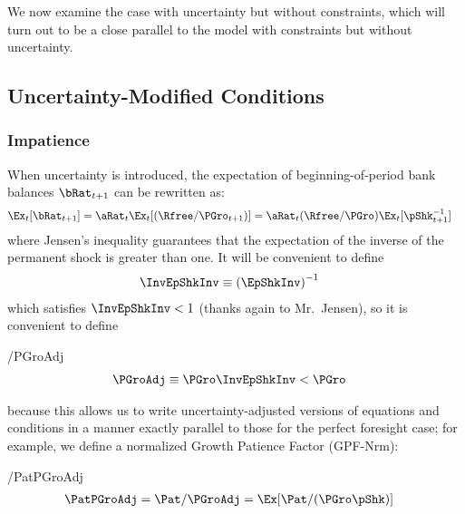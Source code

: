 \documentclass[BufferStockTheory]{subfiles}
\begin{document}
We now examine the case with uncertainty but without constraints, which will turn out to be a close parallel to the model with constraints but without uncertainty.

\hypertarget{Uncertainty-Modified-Conditions}{}
\subsection{Uncertainty-Modified Conditions}\label{subsec:UncertaintyModifiedConditions}
\subsubsection{Impatience}

When uncertainty is introduced, the expectation of beginning-of-period bank balances $\bRat_{t+1}$ can be rewritten as:
\begin{align*}
  \Ex_{t}[\bRat_{t+1}]  & =  \aRat_{t}\Ex_{t}[(\Rfree/\PGro_{t+1})] = \aRat_{t}(\Rfree/\PGro)\Ex_{t}[\pShk_{t+1}^{-1}] %
\end{align*}
where Jensen's inequality guarantees that the expectation of the inverse of the permanent shock is greater than one.  It will be convenient to define\hypertarget{InvEpShkInv}{}
\begin{align}
  \InvEpShkInv  & \equiv  {(\EpShkInv)}^{-1} \label{eq:InvEpShkInv}
\end{align}
which satisfies $\InvEpShkInv < 1$ (thanks again to Mr.\ Jensen), so it is convenient to define
\begin{verbatimwrite}{\EqDir/PGroAdj}
  \begin{align}
    \PGroAdj & \equiv \PGro \InvEpShkInv < \PGro \label{eq:PGroAdj}
  \end{align}
\end{verbatimwrite}

because this allows us to write uncertainty-adjusted versions of equations and conditions in a manner exactly parallel to those for the perfect foresight case; for example, we define a normalized Growth Patience Factor (GPF-Nrm):
\hypertarget{GICNrm}{}\hypertarget{GICNrmI}{}\hypertarget{PermGroAdj}{}
\begin{verbatimwrite}{\EqDir/PatPGroAdj}
  \begin{align}
    \PatPGroAdj  & = \Pat/\PGroAdj = \Ex[\Pat/(\PGro\pShk)]  \label{eq:GPFNrm}
  \end{align}
\end{verbatimwrite}

\end{document}
